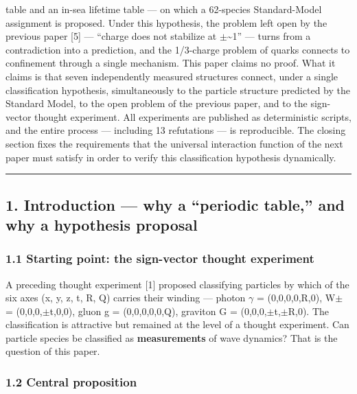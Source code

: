 \documentclass[
]{article}
\begin{document}
table and an in-sea lifetime table --- on which a 62-species
Standard-Model assignment is proposed. Under this hypothesis, the
problem left open by the previous paper {[}5{]} --- ``charge does not
stabilize at \(\pm\)\textasciitilde1'' --- turns from a contradiction
into a prediction, and the 1/3-charge problem of quarks connects to
confinement through a single mechanism. This paper claims no proof. What
it claims is that seven independently measured structures connect, under
a single classification hypothesis, simultaneously to the particle
structure predicted by the Standard Model, to the open problem of the
previous paper, and to the sign-vector thought experiment. All
experiments are published as deterministic scripts, and the entire
process --- including 13 refutations --- is reproducible. The closing
section fixes the requirements that the universal interaction function
of the next paper must satisfy in order to verify this classification
hypothesis dynamically.

\begin{center}\rule{0.5\linewidth}{0.5pt}\end{center}

\subsection{1. Introduction --- why a ``periodic table,'' and why a
hypothesis
proposal}\label{introduction-why-a-periodic-table-and-why-a-hypothesis-proposal}

\subsubsection{1.1 Starting point: the sign-vector thought
experiment}\label{starting-point-the-sign-vector-thought-experiment}

A preceding thought experiment {[}1{]} proposed classifying particles by
which of the six axes (x, y, z, t, R, Q) carries their winding ---
photon \(\gamma\) = (0,0,0,0,R,0), W\(\pm\) = (0,0,0,\(\pm\)t,0,0),
gluon g = (0,0,0,0,0,Q), graviton G = (0,0,0,\(\pm\)t,\(\pm\)R,0). The
classification is attractive but remained at the level of a thought
experiment. Can particle species be classified as \textbf{measurements}
of wave dynamics? That is the question of this paper.

\subsubsection{1.2 Central proposition}\label{central-proposition}
\end{document}

